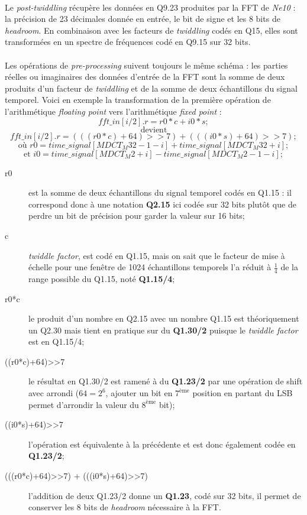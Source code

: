 \documentclass{article}
\begin{document}
    \paragraph{}
    Le \emph{post-twiddling} récupère les données en Q9.23 produites par la FFT de \emph{Ne10} : la précision de 23 décimales donnée en entrée, le bit de signe et les 8 bits de \emph{headroom}. En combinaison avec les facteurs de \emph{twiddling} codés en Q15, elles sont transformées en un spectre de fréquences codé en Q9.15 sur 32 bits.

    \paragraph{}
    Les opérations de \emph{pre-processing} suivent toujours le même schéma : les parties réelles ou imaginaires des données d'entrée de la FFT sont la somme de deux produits d'un facteur de \emph{twiddling} et de la somme de deux échantillons du signal temporel. Voici en exemple la transformation de la première opération de l'arithmétique \emph{floating point} vers l'arithmétique \emph{fixed point} :
    $$fft\_in[i/2].r = r0*c + i0*s;$$
    $$\text{devient}$$
    $$fft\_in[i/2].r = (((r0*c)+64)>>7) + (((i0*s)+64)>>7);$$
    $$\text{où } r0 = time\_signal[MDCT_M32-1-i] + time\_signal[MDCT_M32+i];$$
    $$\text{et } i0 = time\_signal[MDCT_M2+i] - time\_signal[MDCT_M2-1-i];$$

    \begin{description}
        \item[r0] est la somme de deux échantillons du signal temporel codés en Q1.15 : il correspond donc à une notation \textbf{Q2.15} ici codée sur 32 bits plutôt que de perdre un bit de précision pour garder la valeur sur 16 bits;
        \item[c] \emph{twiddle factor}, est codé en Q1.15, mais on sait que le facteur de mise à échelle pour une fenêtre de 1024 échantillons temporels l'a réduit à $\frac{1}{4}$ de la range possible du Q1.15, noté \textbf{Q1.15/4};
        \item[r0*c] le produit d'un nombre en Q2.15 avec un nombre Q1.15 est théoriquement un Q2.30 mais tient en pratique sur du \textbf{Q1.30/2} puisque le \emph{twiddle factor} est en Q1.15/4;
        \item[((r0*c)+64)>>7] le résultat en Q1.30/2 est ramené à du \textbf{Q1.23/2} par une opération de shift avec arrondi ($64 = 2^6$, ajouter un bit en $7^{\text{ème}}$ position en partant du LSB permet d'arrondir la valeur du $8^{\text{ème}}$ bit);
        \item[((i0*s)+64)>>7] l'opération est équivalente à la précédente et est donc également codée en \textbf{Q1.23/2};
        \item[(((r0*c)+64)>>7) + (((i0*s)+64)>>7)] l'addition de deux Q1.23/2 donne un \textbf{Q1.23}, codé sur 32 bits, il permet de conserver les 8 bits de \emph{headroom} nécessaire à la FFT.
    \end{description}
\end{document}
